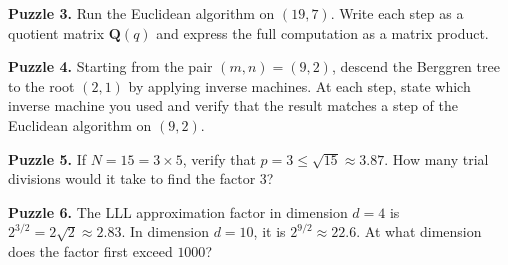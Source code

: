 \begin{displayquote}
\textbf{Puzzle 3.} Run the Euclidean algorithm on $(19, 7)$. Write each step as a quotient matrix $\mathbf{Q}(q)$ and express the full computation as a matrix product.
\end{displayquote}



\begin{displayquote}
\textbf{Puzzle 4.} Starting from the pair $(m, n) = (9, 2)$, descend the Berggren tree to the root $(2, 1)$ by applying inverse machines. At each step, state which inverse machine you used and verify that the result matches a step of the Euclidean algorithm on $(9, 2)$.
\end{displayquote}



\begin{displayquote}
\textbf{Puzzle 5.} If $N = 15 = 3 \times 5$, verify that $p = 3 \le \sqrt{15} \approx 3.87$. How many trial divisions would it take to find the factor $3$?
\end{displayquote}



\begin{displayquote}
\textbf{Puzzle 6.} The LLL approximation factor in dimension $d = 4$ is $2^{3/2} = 2\sqrt{2} \approx 2.83$. In dimension $d = 10$, it is $2^{9/2} \approx 22.6$. At what dimension does the factor first exceed $1000$?
\end{displayquote}

